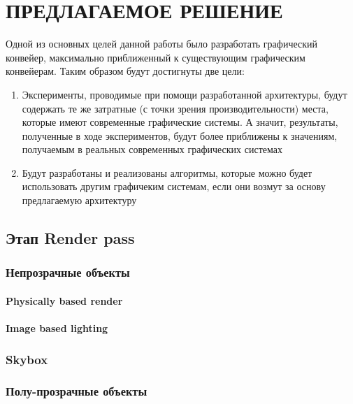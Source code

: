 \chapter{ПРЕДЛАГАЕМОЕ РЕШЕНИЕ} \label{ch3}
Одной из основных целей данной работы было разработать графический конвейер, максимально приближенный к существующим графическим конвейерам. Таким образом будут достигнуты две цели:
\begin{enumerate}[1.] 
	\item Эксперименты, проводимые при помощи разработанной архитектуры, будут содержать те же затратные (с точки зрения производительности) места, которые имеют современные графические системы. А значит, результаты, полученные в ходе экспериментов, будут более приближены к значениям, получаемым в реальных современных графических системах
	\item Будут разработаны и реализованы алгоритмы, которые можно будет использовать другим графичеким системам, если они возмут за основу предлагаемую архитектуру
\end{enumerate}



\section{Этап Render pass} \label{ch3:render_pass}
	\subsection{Непрозрачные объекты} \label{ch3:render_pass:opaque}
		\subsubsection{Physically based render} \label{ch3:render_pass:opaque:pbr}
		\subsubsection{Image based lighting} \label{ch3:render_pass:opaque:ibl}
	\subsection{Skybox} \label{ch3:render_pass:skybox}
	\subsection{Полу-прозрачные объекты} \label{ch3:render_pass:transparents}

